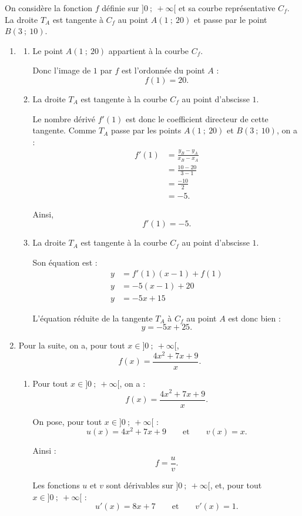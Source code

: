 On considère la fonction $f$ définie sur $]0\ ;\ +\infty[$ et sa courbe représentative $C_f$.
La droite $T_A$ est tangente à $C_f$ au point $A(1\ ;\ 20)$ et passe par le point $B(3\ ;\ 10)$.

\begin{enumerate}
\item \begin{enumerate}
\item Le point $A(1\ ;\ 20)$ appartient à la courbe $C_f$.

Donc l'image de $1$ par $f$ est l'ordonnée du point $A$ :
\[
f(1)=20.
\]
\item La droite $T_A$ est tangente à la courbe $C_f$ au point d'abscisse $1$.

Le nombre dérivé $f'(1)$ est donc le coefficient directeur de cette tangente.
Comme $T_A$ passe par les points $A(1\ ;\ 20)$ et $B(3\ ;\ 10)$, on a :
\begin{align*}
	f'(1)&=\frac{y_B-y_A}{x_B-x_A}\\
	&=\frac{10-20}{3-1}\\
	&=\frac{-10}{2}\\
	&=-5.
\end{align*}

Ainsi,
\[
f'(1)=-5.
\]
\item La droite $T_A$ est tangente à la courbe $C_f$ au point d'abscisse $1$.

Son équation est :
\begin{align*}
y&=f'(1)(x-1)+f(1)\\
y&=-5(x-1)+20\\
y&=-5x+15
\end{align*}

L'équation réduite de la tangente $T_A$ à $C_f$ au point $A$ est donc bien :
\[
y=-5x+25.
\]
\end{enumerate}

\item Pour la suite, on a, pour tout $x\in]0\ ;\ +\infty[$,
\[
f(x)=\frac{4x^2+7x+9}{x}.
\]

\begin{enumerate}
\item Pour tout $x\in]0\ ;\ +\infty[$, on a :
$$
f(x)=\frac{4x^2+7x+9}{x}.
$$

On pose, pour tout $x\in]0\ ;\ +\infty[$ :
$$
u(x)=4x^2+7x+9
\qquad \text{et} \qquad
v(x)=x.
$$

Ainsi :
$$
f=\frac{u}{v}.
$$

Les fonctions $u$ et $v$ sont dérivables sur $]0\ ;\ +\infty[$, et, pour tout $x\in]0\ ;\ +\infty[$ :
$$
u'(x)=8x+7
\qquad \text{et} \qquad
v'(x)=1.
$$


\end{enumerate}
\end{enumerate}
